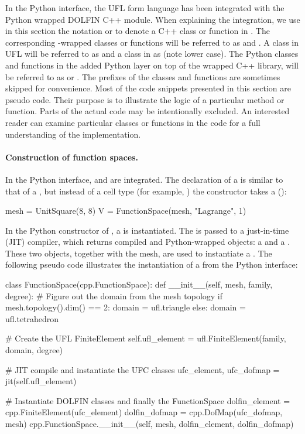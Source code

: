 In the Python interface, the UFL form language has been integrated
with the Python wrapped DOLFIN C++ module.  When explaining the
integration, we use in this section the notation 
or  to denote a C++ class or function in \dolfin. The
corresponding \swig-wrapped classes or functions will be referred to
as  and . A class in UFL will be referred
to as  and a class in \ufc as  (note lower
case). The Python classes and functions in the added Python layer on
top of the wrapped C++ library, will be referred to as 
or . The prefixes of the classes and functions are
sometimes skipped for convenience. Most of the code snippets presented
in this section are pseudo code. Their purpose is to illustrate the
logic of a particular method or function. Parts of the actual code may
be intentionally excluded. An interested reader can examine particular classes or
functions in the code for a full understanding of the implementation.

\paragraph{Construction of function spaces.}
In the Python interface,  and
 are integrated. The declaration of a
 is similar to that of a ,
but instead of a cell type (for example, ) the
 constructor takes a  ():
\begin{python}
mesh = UnitSquare(8, 8)
V = FunctionSpace(mesh, "Lagrange", 1)
\end{python}
In the Python constructor of , a
 is instantiated. The 
is passed to a just-in-time (JIT) compiler, which returns compiled
and Python-wrapped  objects: a 
and a . These two objects, together with the mesh,
are used to instantiate a . The following pseudo
code illustrates the instantiation of a  from the
Python interface:
\begin{python}
class FunctionSpace(cpp.FunctionSpace):
    def __init__(self, mesh, family, degree):
        # Figure out the domain from the mesh topology
        if mesh.topology().dim() == 2:
            domain = ufl.triangle
        else:
            domain = ufl.tetrahedron

        # Create the UFL FiniteElement
        self.ufl_element = ufl.FiniteElement(family, domain, degree)

        # JIT compile and instantiate the UFC classes
        ufc_element, ufc_dofmap = jit(self.ufl_element)

        # Instantiate DOLFIN classes and finally the FunctionSpace
        dolfin_element = cpp.FiniteElement(ufc_element)
        dolfin_dofmap = cpp.DofMap(ufc_dofmap, mesh)
        cpp.FunctionSpace.__init__(self, mesh, dolfin_element, dolfin_dofmap)
\end{python}

